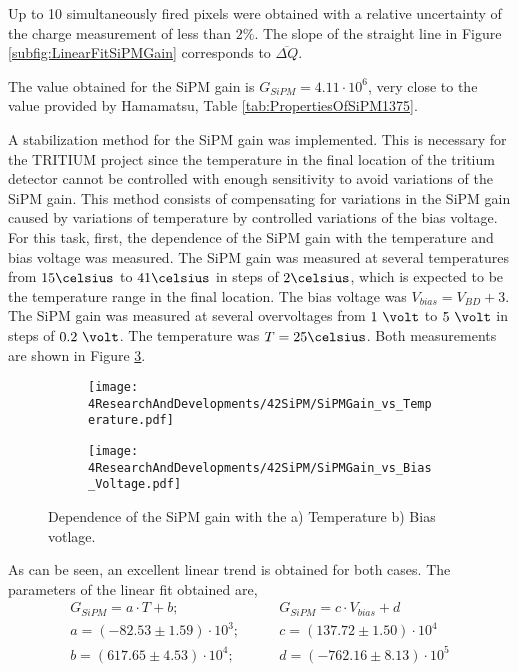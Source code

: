 
Up to 10 simultaneously fired pixels were obtained with a relative uncertainty of the charge measurement of less than $2\%$. The slope of the straight line in Figure \ref{subfig:LinearFitSiPMGain} corresponds to $\overline{\Delta Q}$.

The value obtained for the SiPM gain is $G_{SiPM}=4.11\cdot{} 10^{6}$, very close to the value provided by Hamamatsu, Table \ref{tab:PropertiesOfSiPM1375}.

A stabilization method for the SiPM gain was implemented. This is necessary for the TRITIUM project since the temperature in the final location of the tritium detector cannot be controlled with enough sensitivity to avoid variations of the SiPM gain. This method consists of compensating for variations in the SiPM gain caused by variations of temperature by controlled variations of the bias voltage. For this task, first, the dependence of the SiPM gain with the temperature and bias voltage was measured. The SiPM gain was measured at several temperatures from $15\celsius$ to $41\celsius$ in steps of $2\celsius$, which is expected to be the temperature range in the final location. The bias voltage was $V_{bias} = V_{BD}+3$. The SiPM gain was measured at several overvoltages from $1~\volt$ to $5~\volt$ in steps of $0.2~\volt$. The temperature was $T=25\celsius$. Both measurements are shown in Figure \ref{fig:SiPMGainDependance}. 

\begin{figure}
\centering
    \begin{subfigure}[b]{0.47\textwidth}
    \centering
    \texttt{[image: 4ResearchAndDevelopments/42SiPM/SiPMGain\_vs\_Temperature.pdf]}  
    \caption{\label{subfig:SiPMGainvsTemperature}}
    \end{subfigure}
    \hfill
    \begin{subfigure}[b]{0.47\textwidth}
    \centering
    \texttt{[image: 4ResearchAndDevelopments/42SiPM/SiPMGain\_vs\_Bias\_Voltage.pdf]}  
    \caption{\label{subfig:SiPMGainvsBiasVoltage}}
    \end{subfigure}
 \caption{Dependence of the SiPM gain with the a) Temperature b) Bias votlage.}
 \label{fig:SiPMGainDependance}
\end{figure}

As can be seen, an excellent linear trend is obtained for both cases. The  parameters of the linear fit obtained are,
\begin{equation*}
\begin{split}
G_{SiPM}=a \cdot{} T + b;& \qquad G_{SiPM}=c \cdot{} V_{bias} + d\\
a=\left( -82.53 \pm 1.59 \right) \cdot{} 10^{3};& \qquad c=\left( 137.72 \pm 1.50 \right) \cdot{} 10^{4}\\
b=\left( 617.65 \pm 4.53 \right) \cdot{} 10^{4};& \qquad d=\left( -762.16 \pm 8.13 \right) \cdot{} 10^{5} \\
\label{SiPMGainVSTempV}
\end{split}
\end{equation*} 

